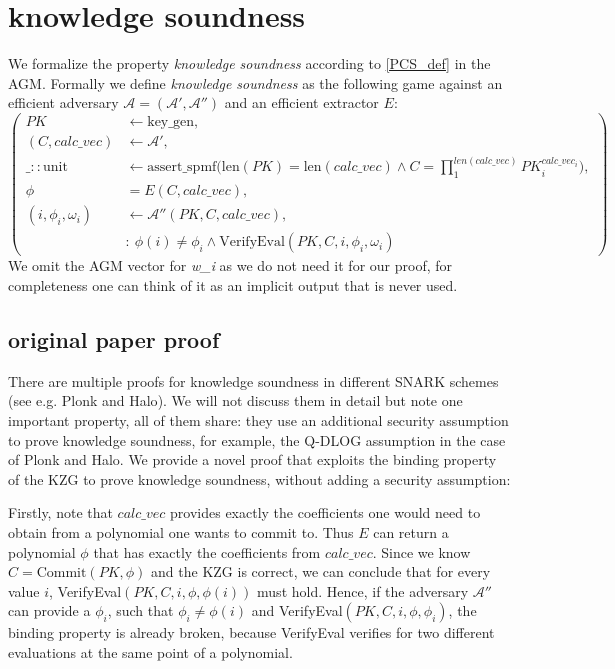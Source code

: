 \section{knowledge soundness}
We formalize the property \textit{knowledge soundness} according to \ref{PCS_def} in the AGM. Formally we define \textit{knowledge soundness} as the following game against an efficient adversary $\mathcal{A=(A',A'')}$ and an efficient extractor $E$: 
\begin{equation*}
    \left(
        \begin{aligned}
            PK &\leftarrow \text{key\_gen}, \\
            (C,calc\_vec) &\leftarrow \mathcal{A'}, \\
            \_::\text{unit} &\leftarrow \text{assert\_spmf}\biggl(\text{len}(PK)=\text{len}(calc\_vec) \land C = \prod_{1}^{len(calc\_vec)}PK_i^{calc\_vec_i}\biggr), \\
            \phi &= E(C, calc\_vec),\\
            (i, \phi_i, \omega_i) &\leftarrow \mathcal{A''}(PK, C, calc\_vec), \\
            & : \ \phi(i) \ne \phi_i \land \text{VerifyEval}(PK,C,i,\phi_i,\omega_i)
        \end{aligned}
        \right)
\end{equation*}
We omit the AGM vector for \textit{w\_i} as we do not need it for our proof, for completeness one can think of it as an implicit output that is never used.

\subsection{original paper proof}
\label{security:knowledge:paper}
There are multiple proofs for knowledge soundness in different SNARK schemes (see e.g. Plonk\parencite{plonk} and Halo\parencite{halo}). We will not discuss them in detail but note one important property, all of them share: they use an additional security assumption to prove knowledge soundness, for example, the Q-DLOG assumption in the case of Plonk and Halo. We provide a novel proof that exploits the binding property of the KZG to prove knowledge soundness, without adding a security assumption: 

Firstly, note that $calc\_vec$ provides exactly the coefficients one would need to obtain from a polynomial one wants to commit to. Thus $E$ can return a polynomial $\phi$ that has exactly the coefficients from $calc\_vec$. Since we know $C= \text{Commit}(PK, \phi)$ and the KZG is correct, we can conclude that for every value $i$, VerifyEval$(PK, C, i, \phi, \phi(i))$ must hold. Hence, if the adversary $\mathcal{A''}$ can provide a $\phi_i$, such that $\phi_i\ne\phi(i)$
and VerifyEval$(PK, C, i, \phi, \phi_i)$, the binding property is already broken, because VerifyEval verifies for two different evaluations at the same point of a polynomial.

